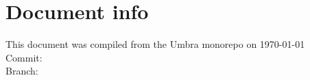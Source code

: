 \documentclass[11pt,a4paper,oneside]{report}
\begin{document}

    \selectthesislanguage



    \tableofcontents\cleardoublepage





    
    
    
    
    







    




    \newpage
    \chapter*{Document info}
    This document was compiled from the Umbra monorepo on \today \\
    Commit: \gitcommit \\
    Branch: \gitbranch \\

\end{document}
